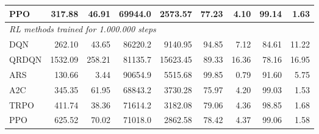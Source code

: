 \begin{samepage}
\begin{center}
\begin{tabular}{l|rr|rr|rr|rr}
    PPO          &   317.88 &    46.91 &    69944.0 &    2573.57 &   77.23 &    4.10 &   99.14 &    1.63 \\
    \midrule
    \multicolumn{9}{l}{\textit{RL methods trained for 1.000.000 steps}} \\
    \midrule
    DQN          &   262.10 &    43.65 &    86220.2 &    9140.95 &   94.85 &    7.12 &   84.61 &   11.22 \\
    QRDQN        &  1532.09 &   258.21 &    81135.7 &   15623.45 &   89.33 &   16.36 &   78.16 &   16.95 \\
    ARS          &   130.66 &     3.44 &    90654.9 &    5515.68 &   99.85 &    0.79 &   91.60 &    5.75 \\
    A2C          &   345.35 &    61.95 &    68843.2 &    3730.28 &   75.97 &    4.20 &   99.03 &    1.53 \\
    TRPO         &   411.74 &    38.36 &    71614.2 &    3182.08 &   79.06 &    4.36 &   98.85 &    1.68 \\
    PPO          &   625.52 &    70.02 &    71018.0 &    2862.58 &   78.42 &    4.37 &   99.06 &    1.58 \\
    \bottomrule
  \end{tabular}
\end{center}
\end{samepage}

